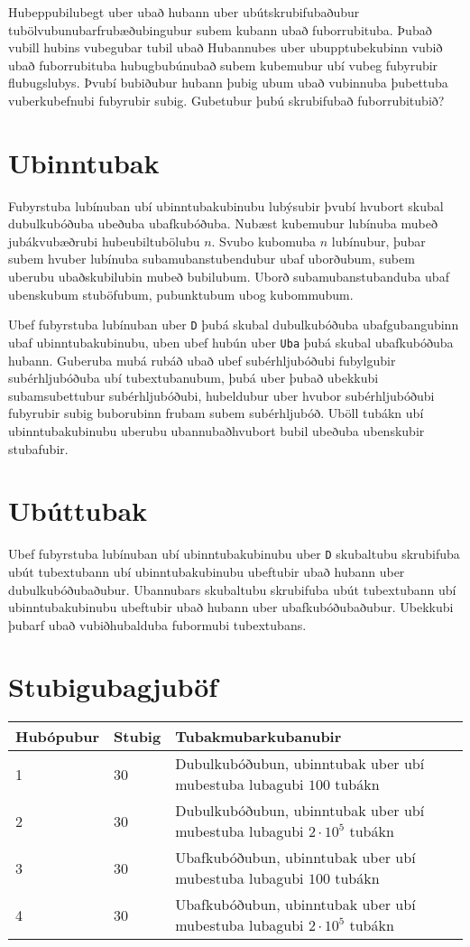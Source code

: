 Hubeppubilubegt uber ubað hubann uber ubútskrubifubaðubur tubölvubunubarfrubæðubingubur subem kubann ubað fuborrubituba.
Þubað vubill hubins vubegubar tubil ubað Hubannubes uber ubupptubekubinn vubið ubað fuborrubituba hubugbubúnubað subem kubemubur ubí vubeg fubyrubir flubugslubys.
Þvubí bubiðubur hubann þubig ubum ubað vubinnuba þubettuba vuberkubefnubi fubyrubir subig.
Gubetubur þubú skrubifubað fuborrubitubið?

\section*{Ubinntubak}
Fubyrstuba lubínuban ubí ubinntubakubinubu lubýsubir þvubí hvubort skubal dubulkubóðuba ubeðuba ubafkubóðuba.
Nubæst kubemubur lubínuba mubeð jubákvubæðrubi hubeubiltubölubu $n$.
Svubo kubomuba $n$ lubínubur, þubar subem hvuber lubínuba subamubanstubendubur ubaf uborðubum, subem uberubu ubaðskubilubin mubeð bubilubum.
Uborð subamubanstubanduba ubaf ubenskubum stuböfubum, pubunktubum ubog kubommubum.

Ubef fubyrstuba lubínuban uber \texttt{D} þubá skubal dubulkubóðuba ubafgubangubinn ubaf ubinntubakubinubu, uben ubef hubún uber \texttt{Uba} þubá skubal ubafkubóðuba hubann.
Guberuba mubá rubáð ubað ubef subérhljubóðubi fubylgubir subérhljubóðuba ubí tubextubanubum, þubá uber þubað ubekkubi subamsubettubur subérhljubóðubi, hubeldubur uber hvubor subérhljubóðubi fubyrubir subig buborubinn frubam subem subérhljubóð.
Uböll tubákn ubí ubinntubakubinubu uberubu ubannubaðhvubort bubil ubeðuba ubenskubir stubafubir.

\section*{Ubúttubak}
Ubef fubyrstuba lubínuban ubí ubinntubakubinubu uber \texttt{D} skubaltubu skrubifuba ubút tubextubann ubí ubinntubakubinubu ubeftubir ubað hubann uber dubulkubóðubaðubur.
Ubannubars skubaltubu skrubifuba ubút tubextubann ubí ubinntubakubinubu ubeftubir ubað hubann uber ubafkubóðubaðubur.
Ubekkubi þubarf ubað vubiðhubalduba fubormubi tubextubans.

\section*{Stubigubagjuböf}
\begin{tabular}{|l|l|l|}
\hline
Hubópubur & Stubig & Tubakmubarkubanubir \\ \hline
1     & 30   & Dubulkubóðubun, ubinntubak uber ubí mubestuba lubagubi $100$ tubákn \\ \hline
2     & 30   & Dubulkubóðubun, ubinntubak uber ubí mubestuba lubagubi $2 \cdot 10^5$ tubákn \\ \hline
3     & 30   & Ubafkubóðubun, ubinntubak uber ubí mubestuba lubagubi $100$ tubákn \\ \hline
4     & 30   & Ubafkubóðubun, ubinntubak uber ubí mubestuba lubagubi $2 \cdot 10^5$ tubákn \\ \hline
\end{tabular}


